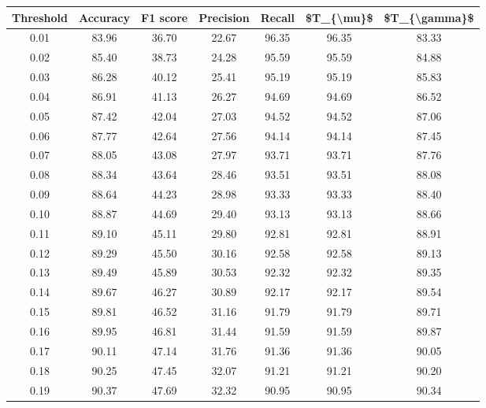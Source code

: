 \begin{tabular}{|c|c|c|c|c|c|c|}
\hline
 Threshold &  Accuracy &  F1 score &  Precision &  Recall &  \$T\_\{\textbackslash mu\}\$ &  \$T\_\{\textbackslash gamma\}\$ \\
\hline
      0.01 &     83.96 &     36.70 &      22.67 &   96.35 &      96.35 &         83.33 \\
      0.02 &     85.40 &     38.73 &      24.28 &   95.59 &      95.59 &         84.88 \\
      0.03 &     86.28 &     40.12 &      25.41 &   95.19 &      95.19 &         85.83 \\
      0.04 &     86.91 &     41.13 &      26.27 &   94.69 &      94.69 &         86.52 \\
      0.05 &     87.42 &     42.04 &      27.03 &   94.52 &      94.52 &         87.06 \\
      0.06 &     87.77 &     42.64 &      27.56 &   94.14 &      94.14 &         87.45 \\
      0.07 &     88.05 &     43.08 &      27.97 &   93.71 &      93.71 &         87.76 \\
      0.08 &     88.34 &     43.64 &      28.46 &   93.51 &      93.51 &         88.08 \\
      0.09 &     88.64 &     44.23 &      28.98 &   93.33 &      93.33 &         88.40 \\
      0.10 &     88.87 &     44.69 &      29.40 &   93.13 &      93.13 &         88.66 \\
      0.11 &     89.10 &     45.11 &      29.80 &   92.81 &      92.81 &         88.91 \\
      0.12 &     89.29 &     45.50 &      30.16 &   92.58 &      92.58 &         89.13 \\
      0.13 &     89.49 &     45.89 &      30.53 &   92.32 &      92.32 &         89.35 \\
      0.14 &     89.67 &     46.27 &      30.89 &   92.17 &      92.17 &         89.54 \\
      0.15 &     89.81 &     46.52 &      31.16 &   91.79 &      91.79 &         89.71 \\
      0.16 &     89.95 &     46.81 &      31.44 &   91.59 &      91.59 &         89.87 \\
      0.17 &     90.11 &     47.14 &      31.76 &   91.36 &      91.36 &         90.05 \\
      0.18 &     90.25 &     47.45 &      32.07 &   91.21 &      91.21 &         90.20 \\
      0.19 &     90.37 &     47.69 &      32.32 &   90.95 &      90.95 &         90.34 \\

\end{tabular}
